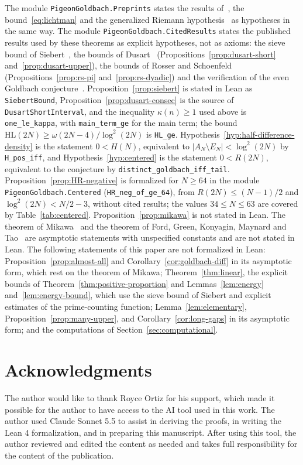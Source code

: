 \documentclass[11pt]{amsart}
\theoremstyle{definition}
\theoremstyle{remark}
\begin{document}
The module \texttt{PigeonGoldbach.Preprints} states the results of~\cite{pintz2026exceptional,johnston2026linnik}, the bound~\eqref{eq:lichtman} and the generalized Riemann hypothesis~\cite{alpoge2026} as hypotheses in the same way. The module \texttt{PigeonGoldbach.CitedResults} states the published results used by these theorems as explicit hypotheses, not as axioms: the sieve bound of Siebert~\cite{siebert1976montgomery}, the bounds of Dusart~\cite{dusart1998autour} (Propositions~\ref{prop:dusart-short} and~\ref{prop:dusart-upper}), the bounds of Rosser and Schoenfeld~\cite{rosser1962approximate} (Propositions~\ref{prop:rs-pi} and~\ref{prop:rs-dyadic}) and the verification of the even Goldbach conjecture~\cite{oliveira2014empirical}. Proposition~\ref{prop:siebert} is stated in Lean as \texttt{SiebertBound}, Proposition~\ref{prop:dusart-consec} is the source of \texttt{DusartShortInterval}, and the inequality $\kappa(n)\geq 1$ used above is \texttt{one\_le\_kappa}, with \texttt{main\_term\_ge} for the main term; the bound $\mathrm{HL}(2N)\geq\omega(2N-4)/\log^2(2N)$ is \texttt{HL\_ge}. Hypothesis~\ref{hyp:half-difference-density} is the statement $0<H(N)$, equivalent to $|A_N\setminus E_N|<\log^2(2N)$ by \texttt{H\_pos\_iff}, and Hypothesis~\ref{hyp:centered} is the statement $0<R(2N)$, equivalent to the conjecture by \texttt{distinct\_goldbach\_iff\_tail}. Proposition~\ref{prop:HR-negative} is formalized for $N\geq 64$ in the module \texttt{PigeonGoldbach.Centered} (\texttt{HR\_neg\_of\_ge\_64}), from $R(2N)\leq(N-1)/2$ and $\log^2(2N)<N/2-3$, without cited results; the values $34\leq N\leq 63$ are covered by Table~\ref{tab:centered}. Proposition~\ref{prop:mikawa} is not stated in Lean. The theorem of Mikawa~\cite{mikawa1991prime} and the theorem of Ford, Green, Konyagin, Maynard and Tao~\cite{ford2018long} are asymptotic statements with unspecified constants and are not stated in Lean. The following statements of this paper are not formalized in Lean: Proposition~\ref{prop:almost-all} and Corollary~\ref{cor:goldbach-diff} in its asymptotic form, which rest on the theorem of Mikawa; Theorem~\ref{thm:linear}, the explicit bounds of Theorem~\ref{thm:positive-proportion} and Lemmas~\ref{lem:energy} and~\ref{lem:energy-bound}, which use the sieve bound of Siebert and explicit estimates of the prime-counting function; Lemma~\ref{lem:elementary}, Proposition~\ref{prop:many-upper}, and Corollary~\ref{cor:long-gaps} in its asymptotic form; and the computations of Section~\ref{sec:computational}.
\section*{Acknowledgments}
The author would like to thank Royce Ortiz for his support, which made it possible for the author to have access to the AI tool used in this work. The author used Claude Sonnet 5.5 to assist in deriving the proofs, in writing the Lean 4 formalization, and in preparing this manuscript. After using this tool, the author reviewed and edited the content as needed and takes full responsibility for the content of the publication.


\end{document}
